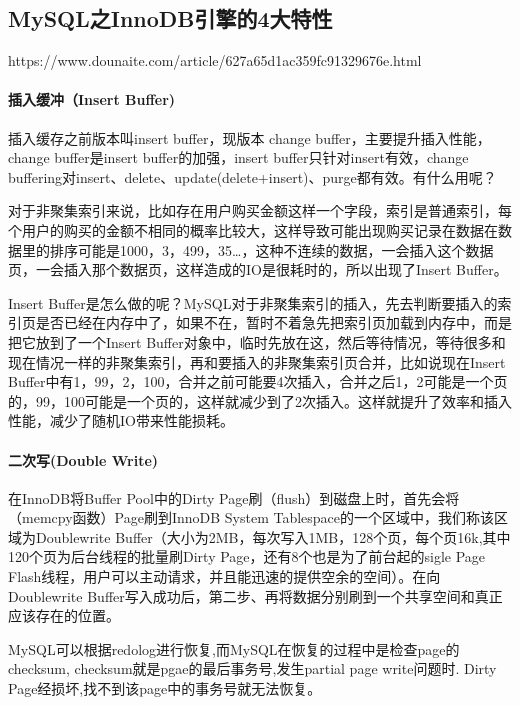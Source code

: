 \documentclass[../../../interview-questions.tex]{subfiles}
\begin{document}
\subsection{MySQL之InnoDB引擎的4大特性}

https://www.dounaite.com/article/627a65d1ac359fc91329676e.html

\paragraph{插入缓冲（Insert Buffer)}

插入缓存之前版本叫insert buffer，现版本 change buffer，主要提升插入性能，change buffer是insert buffer的加强，insert buffer只针对insert有效，change buffering对insert、delete、update(delete+insert)、purge都有效。有什么用呢？

对于非聚集索引来说，比如存在用户购买金额这样一个字段，索引是普通索引，每个用户的购买的金额不相同的概率比较大，这样导致可能出现购买记录在数据在数据里的排序可能是1000，3，499，35…，这种不连续的数据，一会插入这个数据页，一会插入那个数据页，这样造成的IO是很耗时的，所以出现了Insert Buffer。

Insert Buffer是怎么做的呢？MySQL对于非聚集索引的插入，先去判断要插入的索引页是否已经在内存中了，如果不在，暂时不着急先把索引页加载到内存中，而是把它放到了一个Insert Buffer对象中，临时先放在这，然后等待情况，等待很多和现在情况一样的非聚集索引，再和要插入的非聚集索引页合并，比如说现在Insert Buffer中有1，99，2，100，合并之前可能要4次插入，合并之后1，2可能是一个页的，99，100可能是一个页的，这样就减少到了2次插入。这样就提升了效率和插入性能，减少了随机IO带来性能损耗。

\paragraph{二次写(Double Write)}

在InnoDB将Buffer Pool中的Dirty Page刷（flush）到磁盘上时，首先会将（memcpy函数）Page刷到InnoDB System Tablespace的一个区域中，我们称该区域为Doublewrite Buffer（大小为2MB，每次写入1MB，128个页，每个页16k,其中120个页为后台线程的批量刷Dirty Page，还有8个也是为了前台起的sigle Page Flash线程，用户可以主动请求，并且能迅速的提供空余的空间）。在向Doublewrite Buffer写入成功后，第二步、再将数据分别刷到一个共享空间和真正应该存在的位置。

MySQL可以根据redolog进行恢复,而MySQL在恢复的过程中是检查page的checksum, checksum就是pgae的最后事务号,发生partial page write问题时. Dirty Page经损坏,找不到该page中的事务号就无法恢复。
\end{document}
